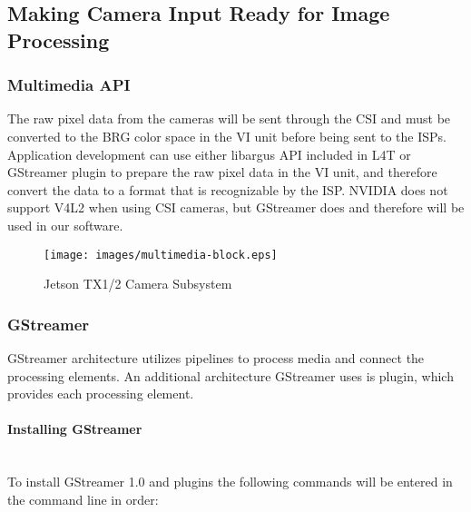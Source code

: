 \documentclass[letterpaper,10pt,serif,draftclsnofoot,onecolumn,compsoc,titlepage]{IEEEtran}
\begin{document}
\subsection{Making Camera Input Ready for Image Processing}

\subsubsection{Multimedia API}

The raw pixel data from the cameras will be sent through the CSI and must be converted 
to the BRG color space in the VI unit before being sent to the ISPs. 
Application development can use either libargus API 
included in L4T or GStreamer plugin to prepare the raw pixel data in the VI unit, and 
therefore convert the data to a format that is recognizable by the ISP. NVIDIA does not 
support V4L2 when using CSI cameras, but GStreamer does and therefore will be used in 
our software.  \\

	\begin{figure}[H]
		\centering
		\label{fig:MultimediaBlockDiagram}
		\texttt{[image: images/multimedia-block.eps]}
		\caption{Jetson TX1/2 Camera Subsystem \label{overflow}}
	\end{figure}

\subsubsection{GStreamer}

GStreamer architecture utilizes pipelines to process media and connect the processing 
elements. An additional architecture GStreamer uses is plugin, which provides each 
processing element. \\

\paragraph{Installing GStreamer}\mbox{} \\ 

To install GStreamer 1.0 and plugins the following commands will be entered in the 
command line in order: \\
\end{document}
